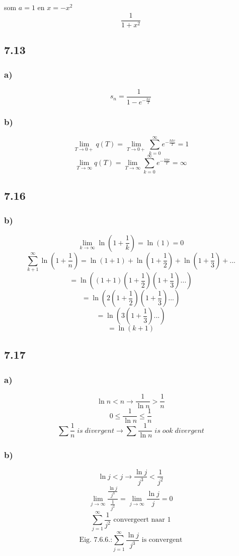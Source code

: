\documentclass[11pt]{article}
\begin{document}
som $a=1$ en $x=-x^2$
$$\frac{1}{1+x^2}$$

\subsection*{7.13}
\subsubsection*{a)}
\[
s_n = \frac{1}{1-e^{-\frac{hv}{T}}}
\]
\subsubsection*{b)}
\[
\lim_{T\rightarrow 0+}q(T) = \lim_{T\rightarrow 0+}\sum_{k=0}^\infty e^{-\frac{hkv}{T}}
=1
\]
\[
\lim_{T\rightarrow \infty}q(T) =\lim_{T\rightarrow \infty}\sum_{k=0}^\infty e^{-\frac{hkv}{T}}
=\infty
\]

\subsection*{7.16}
\subsubsection*{b)}
\[
\lim_{k\rightarrow\infty}\ln\left(1+\frac{1}{k}\right)= \ln(1)=0
\]
\[
\sum_{k+1}^\infty \ln\left(1+\frac{1}{n}\right)= \ln(1+1) + \ln\left(1+\frac{1}{2}\right) + \ln\left(1+\frac{1}{3}\right) + ...
\]
\[
=\ln \left( (1+1)(1+\frac{1}{2})(1+\frac{1}{3})...\right)
\]
\[
=\ln \left( 2 (1+\frac{1}{2})(1+\frac{1}{3})...\right)
\]
\[
=\ln \left( 3(1+\frac{1}{3})...\right)
\]
\[
=\ln(k+1)
\]

\subsection*{7.17}
\subsubsection*{a)}
\[
\ln n < n \rightarrow \frac{1}{\ln n} > \frac{1}{n}
\]
\[
0 \le \frac{1}{\ln n} \le \frac{1}{n}
\]
\[
\sum\frac{1}{n}\;is\;divergent \rightarrow \sum\frac{1}{\ln n}\;is\;ook\;divergent
\]
\subsubsection*{b)}
$$\ln j < j \rightarrow \frac{\ln j}{j ^3} < \frac{1}{j ^2} $$
$$\lim_{j\rightarrow\infty}\frac{\frac{\ln j}{j ^3}}{\frac{1}{j ^2}} = \lim_{j\rightarrow\infty}\frac{\ln j}{j} = 0$$
$$\sum_{j=1}^\infty \frac{1}{j^2}  \text{  convergeert naar 1}$$
$$\text{Eig. 7.6.6.:} \sum_{j=1}^\infty \frac{\ln j}{j^3}  \text{  is convergent}$$
\end{document}
